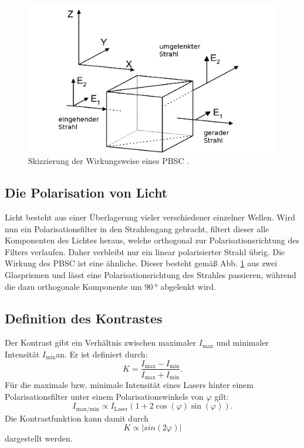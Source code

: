 \begin{figure}
	\centering
	\includegraphics[width=\linewidth-100pt,height=\textheight-100pt,keepaspectratio]{content/Bilder/PBSC.png}
	\caption{Skizzierung der Wirkungsweise eines PBSC \cite{V64}.}
	\label{fig:PBSC}
\end{figure}


\subsection{Die Polarisation von Licht}
Licht besteht aus einer Überlagerung vieler verschiedener einzelner Wellen. Wird nun ein Polarisationsfilter in den Strahlengang gebracht, filtert dieser alle Komponenten des Lichtes heraus, welche orthogonal zur Polarisationsrichtung des Filters verlaufen. Daher verbleibt nur ein linear polarisierter Strahl übrig. Die Wirkung des PBSC ist eine ähnliche. Dieser besteht gemäß Abb. \ref{fig:PBSC} aus zwei Glasprismen und lässt eine Polarisationsrichtung des Strahles passieren, während die dazu orthogonale Komponente um $\SI{90}{\degree}$ abgelenkt wird.

\subsection{Definition des Kontrastes}
Der Kontrast gibt ein Verhältnis zwischen maximaler $I_\text{max}$ und minimaler Intensität $I_\text{min}$an. Er ist definiert durch:
\begin{equation}
    K = \frac{I_\text{max} - I_\text{min}}{I_\text{max} + I_\text{min}} \text{.}          \label{eq:kont}
\end{equation}
Für die maximale bzw. minimale Intensität eines Lasers hinter einem Polarisationsfilter unter einem Polarisationswinkels von $\varphi$ gilt:
\begin{equation}
	I_\text{max/min} \propto I_\text{Laser} \left(  1+ 2 \cos(\varphi) \sin(\varphi) \right) \text{.} \label{eq:I}
\end{equation}
Die Kontrastfunktion kann damit durch
\begin{equation}
	K \propto | sin(2 \varphi) |\label{eq:kontrast}
\end{equation}
dargestellt werden.